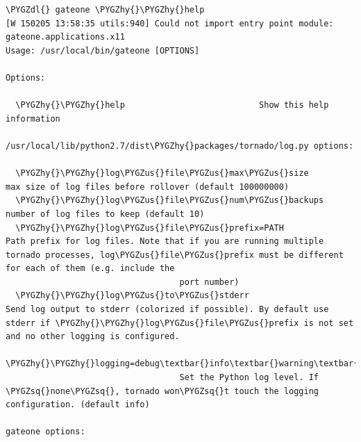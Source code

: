 \documentclass[letterpaper,10pt,openany]{sphinxmanual}
\def\PYGZus{\char`\_}
\def\PYGZdl{\char`\$}
\def\PYGZhy{\char`\-}
\def\PYGZsq{\char`\'}
\begin{document}
\begin{Verbatim}[commandchars=\\\{\}]
\PYGZdl{} gateone \PYGZhy{}\PYGZhy{}help
[W 150205 13:58:35 utils:940] Could not import entry point module: gateone.applications.x11
Usage: /usr/local/bin/gateone [OPTIONS]

Options:

  \PYGZhy{}\PYGZhy{}help                           Show this help information

/usr/local/lib/python2.7/dist\PYGZhy{}packages/tornado/log.py options:

  \PYGZhy{}\PYGZhy{}log\PYGZus{}file\PYGZus{}max\PYGZus{}size              max size of log files before rollover (default 100000000)
  \PYGZhy{}\PYGZhy{}log\PYGZus{}file\PYGZus{}num\PYGZus{}backups           number of log files to keep (default 10)
  \PYGZhy{}\PYGZhy{}log\PYGZus{}file\PYGZus{}prefix=PATH           Path prefix for log files. Note that if you are running multiple tornado processes, log\PYGZus{}file\PYGZus{}prefix must be different for each of them (e.g. include the
                                   port number)
  \PYGZhy{}\PYGZhy{}log\PYGZus{}to\PYGZus{}stderr                  Send log output to stderr (colorized if possible). By default use stderr if \PYGZhy{}\PYGZhy{}log\PYGZus{}file\PYGZus{}prefix is not set and no other logging is configured.
  \PYGZhy{}\PYGZhy{}logging=debug\textbar{}info\textbar{}warning\textbar{}error\textbar{}none 
                                   Set the Python log level. If \PYGZsq{}none\PYGZsq{}, tornado won\PYGZsq{}t touch the logging configuration. (default info)

gateone options:


\end{Verbatim}
\end{document}
